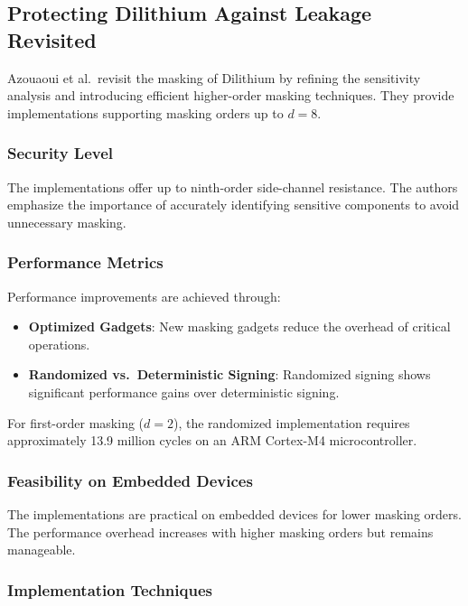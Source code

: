 \subsection{Protecting Dilithium Against Leakage Revisited}

Azouaoui et al.\ revisit the masking of Dilithium by refining the sensitivity analysis and introducing efficient higher-order masking techniques. They provide implementations supporting masking orders up to $d = 8$.

\subsubsection{Security Level}

The implementations offer up to ninth-order side-channel resistance. The authors emphasize the importance of accurately identifying sensitive components to avoid unnecessary masking.

\subsubsection{Performance Metrics}

Performance improvements are achieved through:

\begin{itemize}
    \item \textbf{Optimized Gadgets}: New masking gadgets reduce the overhead of critical operations.
    \item \textbf{Randomized vs.\ Deterministic Signing}: Randomized signing shows significant performance gains over deterministic signing.
\end{itemize}

For first-order masking ($d=2$), the randomized implementation requires approximately 13.9 million cycles on an ARM Cortex-M4 microcontroller.

\subsubsection{Feasibility on Embedded Devices}

The implementations are practical on embedded devices for lower masking orders. The performance overhead increases with higher masking orders but remains manageable.

\subsubsection{Implementation Techniques}

